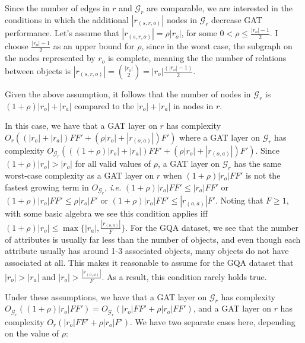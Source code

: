 Since the number of edges in \(r\) and \(\mathcal{G}_r\) are comparable, we are interested in the conditions in which the additional \(|r_{(s, r, o)}|\) nodes in \(\mathcal{G}_r\) decrease GAT performance. Let's assume that \(|r_{(s,r,o)}| = \rho |r_o|\), for some \(0 < \rho \leq \frac{|r_o| - 1}{2}\). I choose \(\frac{|r_o| - 1}{2}\) as an upper bound for \(\rho\), since in the worst case, the subgraph on the nodes represented by \(r_o\) is complete, meaning the the number of relations between objects is \(|r_{(s,r,o)}| = {|r_o| \choose 2} = |r_o|\frac{(|r_o| - 1)}{2}\).

Given the above assumption, it follows that the number of nodes in \(\mathcal{G}_r\) is \((1 + \rho)|r_o| + |r_a|\) compared to the \(|r_o| + |r_a|\) in nodes in \(r\).



In this case, we have that a GAT layer on \(r\) has complexity \(O_r((|r_o| + |r_a|)FF' + (\rho|r_o| + |r_{(o, a)}|)F')\) where a GAT layer on \(\mathcal{G}_r\) has complexity \(O_{\mathcal{G}_r}(((1 + \rho)|r_o| + |r_a|)FF' + (\rho|r_o| + |r_{(o, a)}|)F')\). Since \((1 + \rho)|r_o| > |r_o|\) for all valid values of \(\rho\), a GAT layer on \(\mathcal{G}_r\) has the same worst-case complexity as a GAT layer on \(r\) when \((1 + \rho)|r_o|FF'\) is not the fastest growing term in \(O_{\mathcal{G}_r}\), \textit{i.e.} \((1 + \rho)|r_o|FF' \leq |r_a|FF'\) or \((1 + \rho)|r_o|FF' \leq \rho|r_o|F'\) or \((1 + \rho)|r_o|FF' \leq |r_{(o, a)}|F'\). Noting that \(F \geq 1\), with some basic algebra we see this condition applies iff \((1 + \rho)|r_o| \leq \max\{|r_a|, \frac{|r_{(o,a)}|}{F}\}\). For the GQA dataset, we see that the number of attributes is usually far less than the number of objects, and even though each attribute usually has around 1-3 associated objects, many objects do not have associated at all. This makes it reasonable to assume for the GQA dataset that \(|r_o| > |r_a|\) and \(|r_o| > \frac{|r_{(o,a)}|}{F}\). As a result, this condition rarely holds true.

Under these assumptions, we have that a GAT layer on \(\mathcal{G}_r\) has complexity \(O_{\mathcal{G}_r}((1 + \rho)|r_o|FF') = O_{\mathcal{G}_r}(|r_o|FF' + \rho|r_o|FF')\), and a GAT layer on \(r\) has complexity  \(O_r(|r_o|FF' + \rho|r_o|F')\). We have two separate cases here, depending on the value of \(\rho\):

